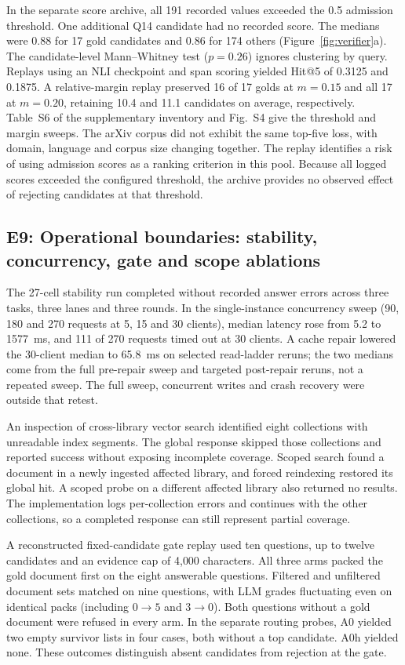 In the separate score archive, all 191 recorded values exceeded the
0.5 admission threshold. One additional Q14 candidate had no recorded
score. The medians were 0.88 for 17 gold candidates and 0.86 for 174
others (Figure~\ref{fig:verifier}a). The candidate-level Mann--Whitney
test ($p=0.26$) ignores clustering by query. Replays using an NLI
checkpoint and span scoring yielded Hit@5 of 0.3125 and 0.1875. A
relative-margin replay preserved 16 of 17 golds at $m=0.15$ and all 17
at $m=0.20$, retaining 10.4 and 11.1 candidates on average, respectively.
Table~S6 of the supplementary inventory and Fig.~S4 give the threshold
and margin sweeps. The arXiv corpus did not exhibit the same top-five
loss, with domain, language and corpus size changing together. The
replay identifies a risk of using admission scores as a ranking
criterion in this pool. Because all logged scores exceeded the configured
threshold, the archive provides no observed effect of rejecting
candidates at that threshold.

\subsection{E9: Operational boundaries: stability, concurrency, gate and
scope ablations}
\label{sec:e7}
The 27-cell stability run completed without recorded answer errors
across three tasks, three lanes and three rounds. In the single-instance
concurrency sweep (90, 180 and 270 requests at 5, 15 and 30 clients),
median latency rose from 5.2 to 1577~ms, and 111 of 270 requests timed
out at 30 clients. A cache repair lowered the 30-client median to
65.8~ms on selected read-ladder reruns; the two medians come from the
full pre-repair sweep and targeted post-repair reruns, not a repeated
sweep. The full sweep, concurrent writes
and crash recovery were outside that retest.

An inspection of cross-library vector search identified eight collections
with unreadable index segments. The global response skipped those
collections and reported success without exposing incomplete coverage.
Scoped search found a document in a newly ingested affected library,
and forced reindexing restored its global hit. A scoped probe on a
different affected library also returned no results. The implementation
logs per-collection errors and continues with the other collections, so
a completed response can still represent partial coverage.

A reconstructed fixed-candidate gate replay used ten questions, up to twelve
candidates and an evidence cap of 4{,}000 characters. All three arms
packed the gold document first on the eight answerable questions.
Filtered and unfiltered document sets matched on nine questions, with
LLM grades fluctuating even on identical packs (including $0\to5$ and
$3\to0$). Both questions without a gold document were refused in every
arm. In the separate routing probes, A0 yielded two empty survivor
lists in four cases, both without a top candidate. A0h yielded none.
These outcomes distinguish absent candidates from rejection at the gate.

